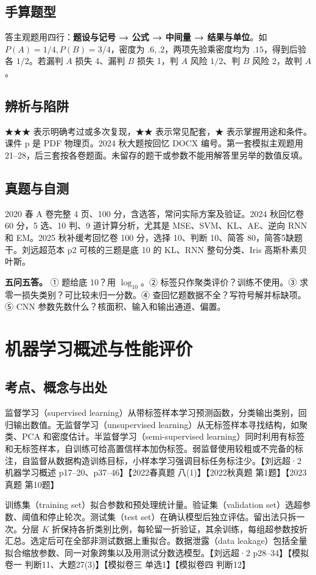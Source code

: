 \documentclass[UTF8,a4paper,zihao=-4,fontset=fandol]{ctexart}
\begin{document}
\subsection{手算题型}
答主观题用四行：\textbf{题设与记号 → 公式 → 中间量 → 结果与单位}。如 $P(A)=1/4,P(B)=3/4$，密度为 $.6,.2$，两项先验乘密度均为 $.15$，得到后验各 $1/2$。若漏判 $A$ 损失 4、漏判 $B$ 损失 1，判 $A$ 风险 $1/2$、判 $B$ 风险 2，故判 $A$。

\subsection{辨析与陷阱}
★★★ 表示明确考过或多次复现，★★ 表示常见配套，★ 表示掌握用途和条件。课件 p 是 PDF 物理页。2024 秋大题按回忆 DOCX 编号。第一套模拟主观题用 21–28，后三套按各卷题面。未留存的题干或参数不能用解答里另举的数值反填。

\subsection{真题与自测}
2020 春 A 卷完整 4 页、100 分，含选答，常问实际方案及验证。2024 秋回忆卷 60 分，5 选、10 判、9 道计算分析，尤其是 MSE、SVM、KL、AE、逆向 RNN 和 EM。2025 秋补缓考回忆卷 100 分，选择 10、判断 10、简答 80，简答5缺题干。刘远超范本 p2 可核的三题是底 10 的 KL、RNN 整句分类、Iris 高斯朴素贝叶斯。

\textbf{五问五答。} ① 题给底 10？用 $\log_{10}$。② 标签只作聚类评价？训练不使用。③ 求零一损失类别？可比较未归一分数。④ 查回忆题数据不全？写符号解并标缺项。⑤ CNN 参数先数什么？核面积、输入和输出通道、偏置。

\section{机器学习概述与性能评价}
\subsection{考点、概念与出处}
监督学习（supervised learning）从带标签样本学习预测函数，分类输出类别，回归输出数值。无监督学习（unsupervised learning）从无标签样本寻找结构，如聚类、PCA 和密度估计。半监督学习（semi-supervised learning）同时利用有标签和无标签样本，自训练可给高置信样本加伪标签。弱监督使用较粗或不完备的标注，自监督从数据构造训练目标，小样本学习强调目标任务标注少。【刘远超·2 机器学习概述 p17--20、p37--46】【2022春真题 八(1)】【2022秋真题 第1题】【2023真题 第10题】
 
训练集（training set）拟合参数和预处理统计量。验证集（validation set）选超参数、阈值和停止轮次。测试集（test set）在确认模型后独立评估。留出法只拆一次。分层 \(K\) 折保持各折类别比例，每轮留一折验证，其余训练，每组超参数按折汇总。选定后可在全部非测试数据上重拟合。数据泄露（data leakage）包括全量拟合缩放参数、同一对象跨集以及用测试分数选模型。【刘远超·2 p28--34】【模拟卷一 判断11、大题27(3)】【模拟卷三 单选1】【模拟卷四 判断12】
 
\end{document}
